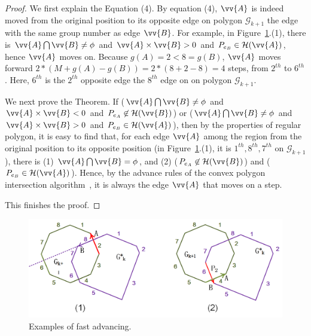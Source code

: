 \begin{proof}
We first explain the Equation (4). 
By equation (4), $\vv{A}$ is indeed moved from the original position to its opposite edge on polygon $\mathcal{G}_{k+1}$ \wrt the edge with the same group number as edge $\vv{B}$.
For example, in Figure~\ref{fig:r-poly-rule1}.(1), there is $\vv{A} \bigcap \vv{B} \ne \phi$ and $\vv{A} \times \vv{B} > 0$ and $P_{e_B} \in \mathcal{H}(\vv{A})$, hence $\vv{A}$ moves on. Because $g(A)=2 < 8=g(B)$, $\vv{A}$ moves forward $2*(M+g(A) - g(B)) = 2*(8+2-8)= 4$ steps, \ie from $2^{th}$ to $6^{th}$. Here, $6^{th}$ is the $2^{th}$ opposite edge \wrt the $8^{th}$ edge on on polygon $\mathcal{G}_{k+1}$.

We next prove the Theorem.
If ($\vv{A} \bigcap \vv{B} \ne \phi$ and $\vv{A} \times \vv{B} < 0$ and $P_{e_A} \not \in \mathcal{H}(\vv{B})$) or ($\vv{A} \bigcap \vv{B} \ne \phi$ and $\vv{A} \times \vv{B} > 0$ and $P_{e_B} \in \mathcal{H}(\vv{A})$), then by the properties of regular polygon, it is easy to find that, for each edge $\vv{A}$ among the region from the original position to its opposite position (\eg in Figure~\ref{fig:r-poly-rule1}.(1), it is $1^{th}, 8^{th}, 7^{th}$ on $\mathcal{G}_{k+1}$), there is (1) $\vv{A} \bigcap \vv{B} = \phi$, and (2) ($P_{e_A} \not \in \mathcal{H}(\vv{B})$) and ($P_{e_B} \in \mathcal{H}(\vv{A})$). Hence, by the advance rules of the convex polygon intersection algorithm~\cite{ORourke:Intersection}, it is always the edge $\vv{A}$ that moves on a step.

This finishes the proof.
\end{proof}

\begin{figure}[tb!]
\centering
\includegraphics[scale=0.88]{figures/Fig-r-poly-rule1.png}
\vspace{-1ex}
\caption{\small Examples of fast advancing.}
\vspace{-2ex}
\label{fig:r-poly-rule1}
\end{figure}




